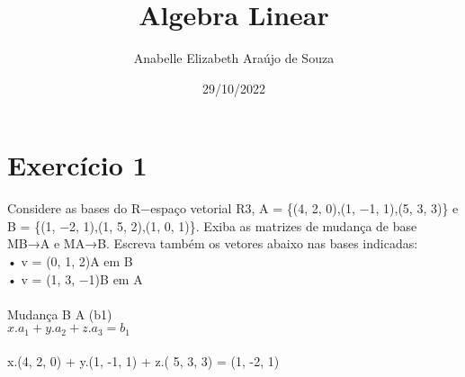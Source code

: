 \documentclass{article}
\title{Algebra Linear}
\date{29/10/2022}
\author{Anabelle Elizabeth Araújo de Souza\\}
\begin{document}
\maketitle

\section{Exercício 1}\label{ex1}
Considere as bases do R−espaço vetorial R3, A = \{(4, 2, 0),(1, −1, 1),(5, 3, 3)\}  e
B = \{(1, −2, 1),(1, 5, 2),(1, 0, 1)\}. Exiba as matrizes de mudança de base MB→A e MA→B. Escreva também os
vetores abaixo nas bases indicadas:
\\• v = (0, 1, 2)A em B
\\• v = (1, 3, −1)B em A\\
\textbf\\{Mudança B \rightarrow A (b1)
\\$x. a_1 + y. a_2 + z. a_3 = b_1 $\\\\}
x.(4, 2, 0) + y.(1, -1, 1) + z.( 5, 3, 3) = (1, -2, 1) \\\\
\end{document}
